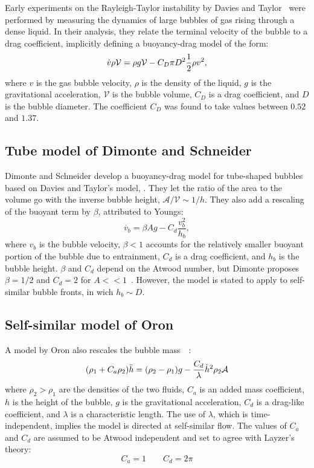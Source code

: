 Early experiments on the Rayleigh-Taylor instability by Davies and Taylor~\cite{Davies1950a} were performed by measuring the dynamics of large bubbles of gas rising through a dense liquid.
In their analysis, they relate the terminal velocity of the bubble to a drag coefficient, implicitly defining a buoyancy-drag model of the form:
\begin{equation} \elabel{dtbd}
\dot{v} \rho \mathcal{V} = \rho g \mathcal{V} - C_D \pi D^2 \frac{1}{2} \rho v^2,
\end{equation}
where $v$ is the gas bubble velocity,
$\rho$ is the density of the liquid,
$g$ is the gravitational acceleration,
$\mathcal{V}$ is the bubble volume,
$C_D$ is a drag coefficient, and
$D$ is the bubble diameter.
The coefficient $C_D$ was found to take values between $0.52$ and $1.37$.

\subsection{Tube model of Dimonte and Schneider}

Dimonte and Schneider develop a buoyancy-drag model for tube-shaped bubbles~\cite{Dimonte1996,Dimonte2000a} based on Davies and Taylor's model, .
They let the ratio of the area to the volume go with the inverse bubble height, $\mathcal{A} / \mathcal{V} \sim 1/h$.
They also add a rescaling of the buoyant term by $\beta$, attributed to Youngs:
\begin{equation}
\dot{v_b}  = \beta A g - C_d \frac{v_b^2}{h_b}, 
\end{equation}
where $v_b$ is the bubble velocity,
$\beta < 1$ accounts for the relatively smaller buoyant portion of the bubble due to entrainment,
$C_d$ is a drag coefficient, and
$h_b$ is the bubble height.
$\beta$ and $C_d$ depend on the Atwood number, but Dimonte proposes $\beta = 1/2$ and $C_d = 2$ for $A << 1$~\cite{Dimonte2000}.
However, the model is stated to apply to self-similar bubble fronts, in wich $h_b \sim D$.

\subsection{Self-similar model of Oron}

A model by Oron \etal also rescales the bubble mass~~\cite{Oron2001}:
\begin{equation} \elabel{buoyancy_drag}
(\rho_1 + C_a \rho_2) \ddot{h} = (\rho_2 - \rho_1)g - \frac{C_d}{\lambda} \dot{h}^2 \rho_2 \mathcal{A}
\end{equation}
where $\rho_2 > \rho_1$ are the densities of the two fluids, 
$C_a$ is an added mass coefficient,
$h$ is the height of the bubble,
$g$ is the gravitational acceleration,
$C_d$ is a drag-like coefficient, and
$\lambda$ is a characteristic length.
The use of $\lambda$, which is time-independent, implies the model is directed at self-similar flow.
The values of $C_a$ and $C_d$ are assumed to be Atwood independent and set to agree with Layzer's theory:
\begin{equation}
C_a = 1 \qquad C_d = 2\pi
\end{equation}

